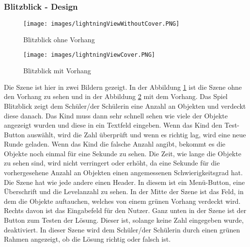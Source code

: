 \subsubsection{Blitzblick - Design}
\begin{figure}[htbp]
  \centering
  \texttt{[image: images/lightningViewWithoutCover.PNG]}
  \caption{Blitzblick ohne Vorhang}
  \label{withoutCover}
\end{figure}
\begin{figure}[htbp]
  \centering
  \texttt{[image: images/lightningViewCover.PNG]}
  \caption{Blitzblick mit Vorhang}
  \label{withCover}
\end{figure}
Die Szene ist hier in zwei Bildern gezeigt. In der Abbildung \ref{withoutCover} ist die Szene ohne den Vorhang zu sehen und in der Abbildung \ref{withCover} mit dem Vorhang. Das Spiel Blitzblick zeigt dem Schüler/der Schülerin eine Anzahl an Objekten und verdeckt diese danach. Das Kind muss dann sehr schnell sehen wie viele der Objekte angezeigt wurden und diese in ein Textfeld eingeben. Wenn das Kind den Test-Button auswählt, wird die Zahl überprüft und wenn es richtig lag, wird eine neue Runde geladen. Wenn das Kind die falsche Anzahl angibt, bekommt es die Objekte noch einmal für eine Sekunde zu sehen. Die Zeit, wie lange die Objekte zu sehen sind, wird nicht verringert oder erhöht, da eine Sekunde für die vorhergesehene Anzahl an Objekten einen angemessenen Schwierigkeitsgrad hat.\\
Die Szene hat wie jede andere einen Header. In diesem ist ein Menü-Button, eine Überschrift und die Levelanzahl zu sehen. In der Mitte der Szene ist das Feld, in dem die Objekte auftauchen, welches von einem grünen Vorhang verdeckt wird. Rechts davon ist das Eingabefeld für den Nutzer. Ganz unten in der Szene ist der Button zum Testen der Lösung. Dieser ist, solange keine Zahl eingegeben wurde, deaktiviert. In dieser Szene wird dem Schüler/der Schülerin durch einen grünen Rahmen angezeigt, ob die Lösung richtig oder falsch ist.\\

